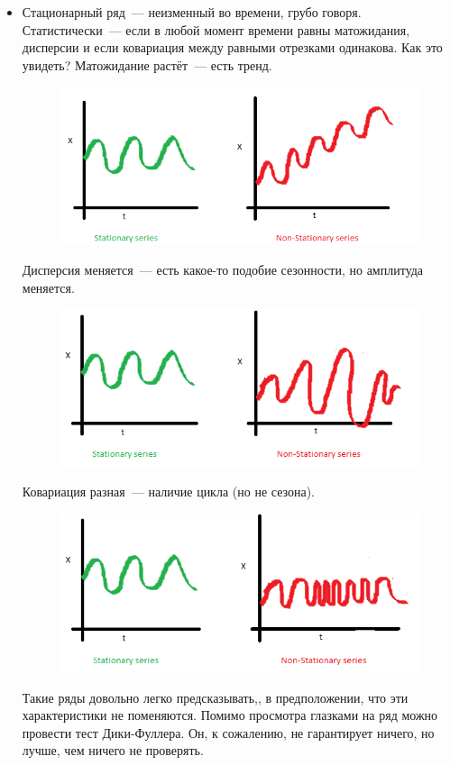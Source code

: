 \documentclass{article}
\begin{document}
    \begin{itemize}
        \item Стационарный ряд~--- неизменный во времени, грубо говоря. Статистически~--- если в любой момент времени равны матожидания, дисперсии и если ковариация между равными отрезками одинакова. Как это увидеть? Матожидание растёт~--- есть тренд.
        \begin{figure}[H]
            \includegraphics[width=.7\linewidth]{Images/Non-stationary_series_1}
        \end{figure}\noindent
        Дисперсия меняется~--- есть какое-то подобие сезонности, но амплитуда меняется.
        \begin{figure}[H]
            \includegraphics[width=.7\linewidth]{Images/Non-stationary_series_2}
        \end{figure}\noindent
        Ковариация разная~--- наличие цикла (но не сезона).
        \begin{figure}[H]
            \includegraphics[width=.7\linewidth]{Images/Non-stationary_series_3}
        \end{figure}\noindent
        Такие ряды довольно легко предсказывать,, в предположении, что эти характеристики не поменяются. Помимо просмотра глазками на ряд можно провести тест Дики-Фуллера. Он, к сожалению, не гарантирует ничего, но лучше, чем ничего не проверять.\\

\end{itemize}
\end{document}
